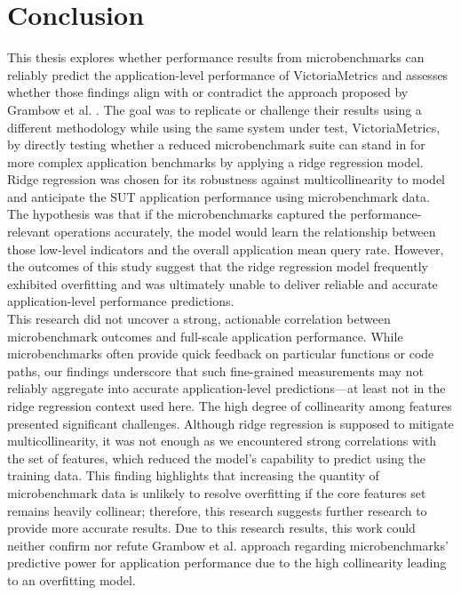 \section{Conclusion}
\label{cha:conclusion}
This thesis explores whether performance results from microbenchmarks can reliably predict the application-level performance of VictoriaMetrics and assesses whether those findings align with or contradict the approach proposed by Grambow et al. \cite{grambow}. The goal was to replicate or challenge their results using a different methodology while using the same system under test, VictoriaMetrics, by directly testing whether a reduced microbenchmark suite can stand in for more complex application benchmarks by applying a ridge regression model. \\
Ridge regression was chosen for its robustness against multicollinearity to model and anticipate the \ac{SUT} application performance using microbenchmark data. The hypothesis was that if the microbenchmarks captured the performance-relevant operations accurately, the model would learn the relationship between those low-level indicators and the overall application mean query rate. However, the outcomes of this study suggest that the ridge regression model frequently exhibited overfitting and was ultimately unable to deliver reliable and accurate application-level performance predictions. \\
This research did not uncover a strong, actionable correlation between microbenchmark outcomes and full-scale application performance. While microbenchmarks often provide quick feedback on particular functions or code paths, our findings underscore that such fine-grained measurements may not reliably aggregate into accurate application-level predictions—at least not in the ridge regression context used here. The high degree of collinearity among features presented significant challenges. Although ridge regression is supposed to mitigate multicollinearity, it was not enough as we encountered strong correlations with the set of features, which reduced the model's capability to predict using the training data. This finding highlights that increasing the quantity of microbenchmark data is unlikely to resolve overfitting if the core features set remains heavily collinear; therefore, this research suggests further research to provide more accurate results. Due to this research results, this work could neither confirm nor refute Grambow et al. \cite{grambow} approach regarding microbenchmarks' predictive power for application performance due to the high collinearity leading to an overfitting model.
